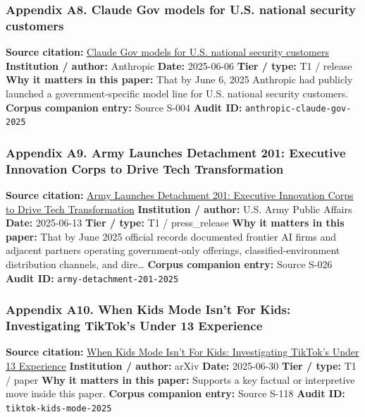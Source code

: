 \documentclass[
  american,
  11pt,
  letterpaper,
]{article}
\begin{document}
\subsubsection{Appendix A8. Claude Gov models for U.S. national security
customers}\label{ch-10-appendix-a8-claude-gov-models-for-u-s-national-security-customers}

\textbf{Source citation:}
\href{https://www.anthropic.com/news/claude-gov-models-for-u-s-national-security-customers}{Claude
Gov models for U.S. national security customers} \textbf{Institution /
author:} Anthropic \textbf{Date:} 2025-06-06 \textbf{Tier / type:} T1 /
release \textbf{Why it matters in this paper:} That by June 6, 2025
Anthropic had publicly launched a government-specific model line for
U.S. national security customers. \textbf{Corpus companion entry:}
Source S-004 \textbf{Audit ID:} \texttt{anthropic-claude-gov-2025}

\subsubsection{Appendix A9. Army Launches Detachment 201: Executive
Innovation Corps to Drive Tech
Transformation}\label{ch-10-appendix-a9-army-launches-detachment-201-executive-innovation-corps-to-drive-tech-transformation}

\textbf{Source citation:}
\href{https://www.army.mil/article/286317/army_launches_detachment_201_executive_innovation_corps_to_drive_tech_transformation}{Army
Launches Detachment 201: Executive Innovation Corps to Drive Tech
Transformation} \textbf{Institution / author:} U.S. Army Public Affairs
\textbf{Date:} 2025-06-13 \textbf{Tier / type:} T1 / press\_release
\textbf{Why it matters in this paper:} That by June 2025 official
records documented frontier AI firms and adjacent partners operating
government-only offerings, classified-environment distribution channels,
and dire\ldots{} \textbf{Corpus companion entry:} Source S-026
\textbf{Audit ID:} \texttt{army-detachment-201-2025}

\subsubsection{Appendix A10. When Kids Mode Isn't For Kids:
Investigating TikTok's Under 13
Experience}\label{ch-10-appendix-a10-when-kids-mode-isn-t-for-kids-investigating-tiktok-s-under-13-experience}

\textbf{Source citation:} \href{https://arxiv.org/abs/2507.00299}{When
Kids Mode Isn't For Kids: Investigating TikTok's Under 13 Experience}
\textbf{Institution / author:} arXiv \textbf{Date:} 2025-06-30
\textbf{Tier / type:} T1 / paper \textbf{Why it matters in this paper:}
Supports a key factual or interpretive move inside this paper.
\textbf{Corpus companion entry:} Source S-118 \textbf{Audit ID:}
\texttt{tiktok-kids-mode-2025}
\end{document}
